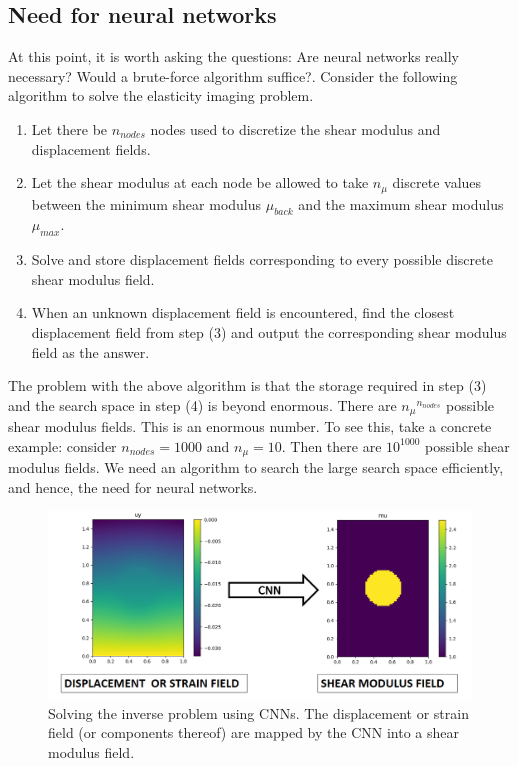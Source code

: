 \documentclass[12pt]{article}
\begin{document}
\subsection{Need for neural networks}
At this point, it is worth asking the questions: Are neural networks really necessary? Would a brute-force algorithm suffice?. Consider the following algorithm to solve the elasticity imaging problem.
%
\begin{enumerate}
\item{Let there be $n_{nodes}$ nodes used to discretize the shear modulus and displacement fields.}
\item{Let the shear modulus at each node be allowed to take $n_{\mu}$ discrete values between the minimum shear modulus $\mu_{back}$ and the maximum shear modulus $\mu_{max}$.}
\item{Solve and store displacement fields corresponding to every possible discrete shear modulus field.}
\item{When an unknown displacement field is encountered, find the closest displacement field from step (3) and output the corresponding shear modulus field as the answer.}
\end{enumerate}

The problem with the above algorithm is that the storage required in step (3) and the search space in step (4) is beyond enormous. There are ${n_{\mu}}^{n_{nodes}}$ possible shear modulus fields. This is an enormous number. To see this, take a concrete example: consider $n_{nodes}=1000$ and $n_{\mu}=10$. Then there are $10^{1000}$ possible shear modulus fields. We need an algorithm to search the large search space efficiently, and hence, the need for neural networks.
%
\begin{figure}[h]
   \centering
    \includegraphics[totalheight=5cm]{Figures/schematic_inv/schematic_inv.png}
  \caption{\label{fig:schematic_inv} Solving the inverse problem using CNNs. The displacement or strain field (or components thereof) are mapped by the CNN into a shear modulus field.}
\end{figure}
%
\end{document}

